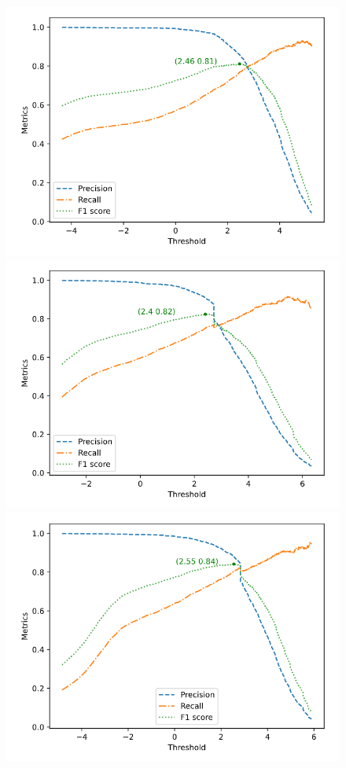 \documentclass[journal,twoside]{IEEEtran}
\begin{document}
\begin{figure}[htbp]
\centerline{\includegraphics[scale=0.23]{Pics/linear-SVM_threshold_acceptor.png}
    \includegraphics[scale=0.23]{Pics/rbf-SVM_threshold_acceptor.png}
    \includegraphics[scale=0.23]{Pics/poly-SVM_threshold_acceptor.png}}

\end{figure}
\end{document}
